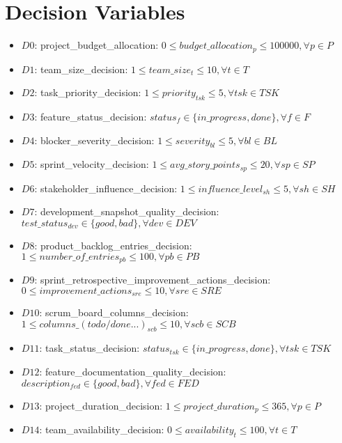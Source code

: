 \documentclass{article}
\begin{document}
\section{Decision Variables}
\begin{itemize}
    \item $D0$: project\_budget\_allocation: $0 \leq budget\_allocation_p \leq 100000, \forall p \in P$
    \item $D1$: team\_size\_decision: $1 \leq team\_size_t \leq 10, \forall t \in T$
    \item $D2$: task\_priority\_decision: $1 \leq priority_{tsk} \leq 5, \forall tsk \in TSK$
    \item $D3$: feature\_status\_decision: $status_f \in \{in\_progress, done\}, \forall f \in F$
    \item $D4$: blocker\_severity\_decision: $1 \leq severity_{bl} \leq 5, \forall bl \in BL$
    \item $D5$: sprint\_velocity\_decision: $1 \leq avg\_story\_points_{sp} \leq 20, \forall sp \in SP$
    \item $D6$: stakeholder\_influence\_decision: $1 \leq influence\_level_{sh} \leq 5, \forall sh \in SH$
    \item $D7$: development\_snapshot\_quality\_decision: $test\_status_{dev} \in \{good, bad\}, \forall dev \in DEV$
    \item $D8$: product\_backlog\_entries\_decision: $1 \leq number\_of\_entries_{pb} \leq 100, \forall pb \in PB$
    \item $D9$: sprint\_retrospective\_improvement\_actions\_decision: $0 \leq improvement\_actions_{sre} \leq 10, \forall sre \in SRE$
    \item $D10$: scrum\_board\_columns\_decision: $1 \leq columns\_(todo/done...)_{scb} \leq 10, \forall scb \in SCB$
    \item $D11$: task\_status\_decision: $status_{tsk} \in \{in\_progress, done\}, \forall tsk \in TSK$
    \item $D12$: feature\_documentation\_quality\_decision: $description_{fed} \in \{good, bad\}, \forall fed \in FED$
    \item $D13$: project\_duration\_decision: $1 \leq project\_duration_p \leq 365, \forall p \in P$
    \item $D14$: team\_availability\_decision: $0 \leq availability_t \leq 100, \forall t \in T$
\end{itemize}
\end{document}
